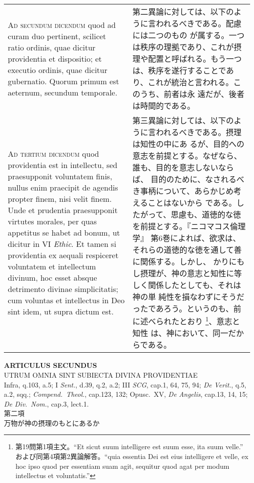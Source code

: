 \documentclass[10pt]{jsarticle} %
\begin{document}
\begin{longtable}{p{21em}p{21em}}
\\


{\scshape Ad secundum dicendum} quod ad curam duo
pertinent, scilicet ratio ordinis, quae dicitur providentia et
dispositio; et executio ordinis, quae dicitur gubernatio. Quorum primum
est aeternum, secundum temporale.


&

第二異論に対しては、以下のように言われるべきである。配慮には二つのもの
が属する。一つは秩序の理拠であり、これが摂理や配置と呼ばれる。もう一つ
は、秩序を遂行することであり、これが統治と言われる。このうち、前者は永
遠だが、後者は時間的である。


\\


{\scshape Ad tertium dicendum} quod providentia est in
intellectu, sed praesupponit voluntatem finis, nullus enim praecipit de
agendis propter finem, nisi velit finem. Unde et prudentia praesupponit
virtutes morales, per quas appetitus se habet ad bonum, ut dicitur in VI
{\itshape Ethic}. Et tamen si providentia ex aequali respiceret voluntatem et
intellectum divinum, hoc esset absque detrimento divinae simplicitatis;
cum voluntas et intellectus in Deo sint idem, ut supra dictum est.


&


第三異論に対しては、以下のように言われるべきである。摂理は知性の中にあ
るが、目的への意志を前提とする。なぜなら、誰も、目的を意志しないならば、
目的のために、なされるべき事柄について、あらかじめ考えることはないから
である。したがって、思慮も、道徳的な徳を前提とする。『ニコマコス倫理学』
第6巻によれば、欲求は、それらの道徳的な徳を通して善に関係する。しかし、
かりにもし摂理が、神の意志と知性に等しく関係したとしても、それは神の単
純性を損なわずにそうだったであろう。というのも、前に述べられたとおり
\footnote{第19問第1項主文。``Et sicut suum intelligere est suum esse,
ita suum velle.'' および同第4項第2異論解答。``quia essentia Dei est
eius intelligere et velle, ex hoc ipso quod per essentiam suam agit,
sequitur quod agat per modum intellectus et voluntatis.''}、意志と知性
は、神において、同一だからである。


\end{longtable}
\newpage

\begin{center}
 {\Large {\bf ARTICULUS SECUNDUS}}\\
 {\large UTRUM OMNIA SINT SUBIECTA DIVINA PROVIDENTIAE}\\
 {\footnotesize Infra, q.103, a.5; I {\itshape Sent.}, d.39, q.2, a.2;
 III {\itshape SCG}, cap.1, 64, 75, 94; {\itshape De Verit.}, q.5, a.2,
 sqq.; {\itshape Compend.~Theol.}, cap.123, 132; Opusc.~XV, {\itshape De
 Angelis}, cap.13, 14, 15; {\itshape De Div.~Nom.}, cap.3, lect.1.}\\
 {\Large 第二項\\万物が神の摂理のもとにあるか}
\end{center}
\end{document}
